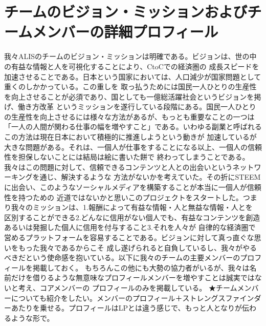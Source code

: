 \documentclass{jsarticle}
\begin{document}
\section{チームのビジョン・ミッションおよびチームメンバーの詳細プロフィール}
我々ALISのチームのビジョン・ミッションは明確である。ビジョンは、世の中の有益な情報と人を可視化することにより、CtoCでの経済圏の
成長スピードを加速させることである。日本という国家においては、人口減少が国家問題として重くのしかかっている。この重しを
取っ払うためには国民一人ひとりの生産性を向上させることが必須であり、国としても一億総活躍社会というビジョンを掲げ、働き方改革
というミッションを遂行している段階にある。国民一人ひとりの生産性を向上させるには様々な方法があるが、もっとも重要なことの一つは
「一人の人間が関わる仕事の幅を増やすこと」である。いわゆる副業と呼ばれるこの方法は現在日本において積極的に推進しようという動きが
加速しているが大きな問題がある。それは、一個人が仕事をすることになる以上、一個人の信頼性を担保しないことには結局は絵に書いた餅で
終わってしまうことである。我々はこの問題に対して、信頼できるコンテンツと人との出会いというネットワーキングを通じ、解決するような
方法がないかを考えていた。その折にSTEEMに出会い、このようなソーシャルメディアを構築することが本当に一個人が信頼性を持つための
近道ではないかと思いこのプロジェクトをスタートした。つまり我々のミッションは、1.報酬によって有益な情報・人と無益な情報・人とを
区別することができる2.どんなに信用がない個人でも、有益なコンテンツを創造あるいは発掘した個人に信用を付与すること3.それを人々が
自律的な経済圏で営めるプラットフォームを容易することである。ビジョンに対して真っ直ぐな思いをもった我々であるからこそ
成し遂げられると自負しているし、我々がやるべきだという使命感を抱いている。以下に我々のチームの主要メンバーのプロフィールを掲載しておく。
もちろんこの他にも大勢の協力者がいるが、我々は名前だけを借りるような無意味なプロフィールメンバーを増やすことは誠実ではないと考え、コアメンバーの
プロフィールのみを掲載している。
★チームメンバーについても紹介をしたい。メンバーのプロフィール＋ストレングスファインダーあたりを乗せる。プロフィールはLPとは違う感じで、もっと人となりが伝わるような形で。
\end{document}
